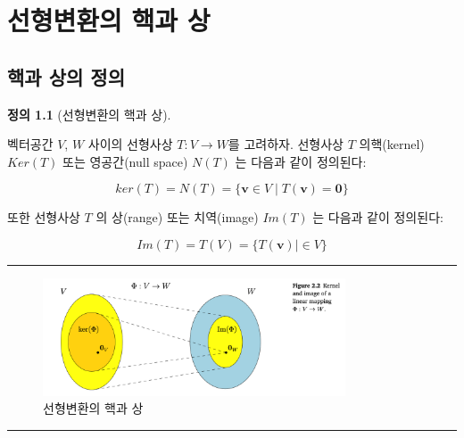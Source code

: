 \documentclass[
  11pt,
  a4paper,
  oneside]{scrbook}
\theoremstyle{definition}
\newtheorem{definition}{정의}[chapter]
\theoremstyle{definition}
\theoremstyle{plain}
\theoremstyle{remark}
\begin{document}

\chapter{선형변환의 핵과 상}\label{linear_kernel}

\section{핵과 상의 정의}\label{uxd575uxacfc-uxc0c1uxc758-uxc815uxc758}

\begin{definition}[선형변환의 핵과
상]\protect\hypertarget{def-kernel}{}\label{def-kernel}

벡터공간 \(V\), \(W\) 사이의 선형사상 \(T :V \rightarrow W\)를 고려하자.
선형사상 \(T\) 의핵(kernel) \(Ker(T)\) 또는 영공간(null space)
\(N (T )\) 는 다음과 같이 정의된다:

\[ ker(T) = N (T ) = \{ \pmb v \in V \mid T( \pmb v) = \pmb 0 \} \]

또한 선형사상 \(T\) 의 상(range) 또는 치역(image) \(Im(T)\) 는 다음과
같이 정의된다:

\[ Im(T) = T(V) = \{ T(\pmb v) \mid \in V \} \]

\end{definition}

\begin{center}\rule{0.5\linewidth}{0.5pt}\end{center}

\begin{figure}[H]

{\centering \includegraphics[width=0.8\textwidth,height=\textheight]{qmds/../images/linear_kernel.png}

}

\caption{선형변환의 핵과 상}

\end{figure}%

\begin{center}\rule{0.5\linewidth}{0.5pt}\end{center}
\end{document}
